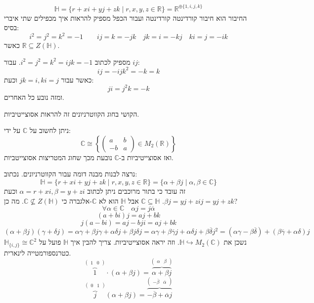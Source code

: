 \documentclass{tstextbook}
\begin{document}
\begin{definition}
$$\mathbb{H} =\{ r+x i + yj+zk\mid r,x,y,z \in \mathbb{R} \}=\mathbb{R}^{\oplus \{ 1,i,j,k \}}$$
החיבור הוא חיבור קורדינטה קורדינטה ועבור הכפל מספיק להראות איך מכפילים שתי איברי בסיס:
$$i^{2}=j^{2}=k^{2}=-1\qquad ij=k=-jk\quad jk=i=-kj\quad ki=j=-ik$$
כאשר \(\mathbb{R}\subseteq Z(\mathbb{H})\).

\end{definition}
\begin{proposition}
מספיק לכתוב \(i^{2}=j^{2}=k^{2}=ijk=-1\). עבור \(ij\):
$$ij=-ijk^{2}=-k=k$$
כאשר עבור \(jk=i,ki=j\) וכעת:
$$ji=j^{2}k=-k$$
ומזה נובע כל האחרים.

\end{proposition}
\begin{remark}
הקושי בחוג הקווטרניונים זה להראות אסוצייטיביות. 

\end{remark}
\begin{reminder}
ניתן לחשוב על \(\mathbb{C}\) על ידי:
$$\mathbb{C}\cong \left\{ \begin{pmatrix}a & b \\-b & a
\end{pmatrix} \in M_{2}(\mathbb{R})\right\}$$
ואז אסוצייטיביות ב-\(\mathbb{C}\) נובעת מכך שחוג המטריצות אסוצייטביות. 

\end{reminder}
נרצה לבנות מבנה דומה עבור הקווטרניונים. נכתוב:
$$\mathbb{H} = \{ r+x i + yj+zk\mid r,x,y,z \in \mathbb{R} \}=\{ \alpha+\beta j\mid \alpha,\beta \in \mathbb{C} \}$$
זה עובד כי בתור מרוכבים ניתן לכתוב \(\alpha=r+x i,\beta = y+zi\) וכעת \(\beta j=yj+zij=yj+zk\). \(\mathbb{C}\subseteq \mathbb{H}\) אבל \(\mathbb{H}\) הוא לא \(\mathbb{C}\)-אלגברה כי \(\mathbb{C}\not\subseteq Z(\mathbb{H})\). מה כן?
$$\forall \alpha \in \mathbb{C}\quad \alpha j=j\overline{\alpha}$$$$(a+bi)j=aj+bk$$$$j(a-bi)=aj-bji=aj+bk$$$$(\alpha+\beta j)(\gamma+\delta j)=\alpha \gamma+\beta j\gamma+\alpha \delta j+\beta j\delta j=\alpha \gamma+\beta \overline{\gamma } j+\alpha \delta j+\beta \overline{\delta}j^{2}=(\alpha \gamma-\beta \overline{\delta} )+(\beta \overline{\gamma} +\alpha \delta)j $$
נשכן את \(\mathbb{H}\hookrightarrow M_{2}(\mathbb{C})\). וזה יראה אסוצייטיביות. צריך להבין איך \(\mathbb{H}\) פועל על \(\mathbb{H}_{\{ i,j \}}\cong \mathbb{C}^{2}\) כטרנספורמטייה לינארית.
$$\overbrace{ 1 }^{ \begin{pmatrix}1 & 0\end{pmatrix} }\cdot(\alpha+\beta j)=\overbrace{ \alpha+\beta j }^{ \begin{pmatrix}\alpha & \beta
\end{pmatrix} }$$$$\overbrace{ j }^{ \begin{pmatrix}0 & 1\end{pmatrix} }(\alpha+\beta j)=\overbrace{ -\overline{\beta} +\overline{\alpha} j }^{ \begin{pmatrix}-\overline{\beta}  & \overline{\alpha}  
\end{pmatrix} }$$
\end{document}
